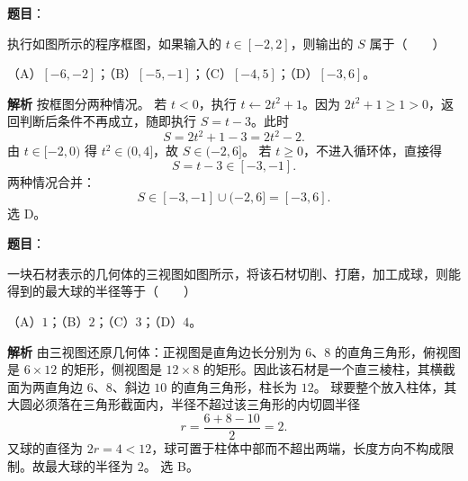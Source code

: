 \begin{answer}

\textbf{题目}：

执行如图所示的程序框图，如果输入的 $t\in[-2,2]$，则输出的 $S$ 属于\mbox{（　　）}
\nopagebreak[4]
\begin{center}\end{center}
\nopagebreak[4]
（A）$[-6,-2]$；（B）$[-5,-1]$；（C）$[-4,5]$；（D）$[-3,6]$。

\textbf{解析}
按框图分两种情况。
若 $t<0$，执行 $t\leftarrow2t^2+1$。因为 $2t^2+1\geqslant1>0$，返回判断后条件不再成立，随即执行 $S=t-3$。此时
\nopagebreak[4]
\[S=2t^2+1-3=2t^2-2 .\]
由 $t\in[-2,0)$ 得 $t^2\in(0,4]$，故 $S\in(-2,6]$。
若 $t\geqslant0$，不进入循环体，直接得
\nopagebreak[4]
\[S=t-3\in[-3,-1].\]
两种情况合并：
\nopagebreak[4]
\[S\in[-3,-1]\cup(-2,6]=[-3,6].\]
选 D。


\end{answer}
\begin{answer}

\textbf{题目}：

一块石材表示的几何体的三视图如图所示，将该石材切削、打磨，加工成球，则能得到的最大球的半径等于\mbox{（　　）}
\nopagebreak[4]
\begin{center}\end{center}
\nopagebreak[4]
（A）$1$；（B）$2$；（C）$3$；（D）$4$。

\textbf{解析}
由三视图还原几何体：正视图是直角边长分别为 $6$、$8$ 的直角三角形，俯视图是 $6\times12$ 的矩形，侧视图是 $12\times8$ 的矩形。因此该石材是一个直三棱柱，其横截面为两直角边 $6$、$8$、斜边 $10$ 的直角三角形，柱长为 $12$。
球要整个放入柱体，其大圆必须落在三角形截面内，半径不超过该三角形的内切圆半径
\nopagebreak[4]
\[r=\frac{6+8-10}2=2 .\]
又球的直径为 $2r=4<12$，球可置于柱体中部而不超出两端，长度方向不构成限制。故最大球的半径为 $2$。
选 B。


\end{answer}
